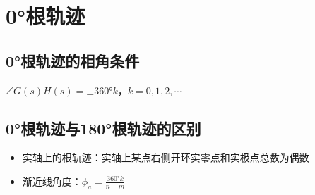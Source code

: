 \section{0°根轨迹}

\subsection{0°根轨迹的相角条件}
$\angle G(s)H(s) = \pm 360°k$，$k = 0, 1, 2, \cdots$

\subsection{0°根轨迹与180°根轨迹的区别}
\begin{itemize}
    \item 实轴上的根轨迹：实轴上某点右侧开环实零点和实极点总数为偶数
    \item 渐近线角度：$\phi_a = \frac{360°k}{n-m}$
\end{itemize}
